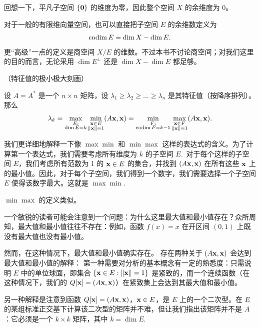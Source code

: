回想一下，平凡子空间 $\{\mathbf{0}\}$ 的维度为零，因此整个空间 $X$ 的余维度为 0。

\begin{remark*}
对于一般的有限维向量空间，也可以直接把子空间 $E$ 的余维数定义为
$$\operatorname{codim} E=\dim X-\dim E.$$
更“高级”一点的定义是商空间 $X/E$ 的维数。不过本书不讨论商空间；对我们这里的目的而言，无论采用 $\dim E^\perp$ 还是 $\dim X-\dim E$ 都足够。
\end{remark*}

\begin{theorem}\label{stmt:07-04-03}  （特征值的极小极大刻画）

设 $A = A^*$ 是一个 $n \times n$ 矩阵，设 $\lambda_1 \ge \lambda_2 \ge \dots \ge \lambda_n$ 是其特征值（按降序排列）。那么
$$\lambda_k = \max_{\substack{E:\\ \dim E = k}} \min_{\substack{\mathbf{x} \in E\\ \|\mathbf{x}\|=1}} (A\mathbf{x}, \mathbf{x}) = \min_{\substack{F:\\ \operatorname{codim} F = k-1}} \max_{\substack{\mathbf{x} \in F\\ \|\mathbf{x}\|=1}} (A\mathbf{x}, \mathbf{x}).$$\end{theorem}

我们更详细地解释一下像 $\max \min$ 和 $\min \max$ 这样的表达式的含义。为了计算第一个表达式，我们需要考虑所有维度为 $k$ 的子空间 $E$.~对于每个这样的子空间 $E$，我们考虑所有范数为 1 的 $\mathbf{x} \in E$ 的集合，并找到 $(A\mathbf{x}, \mathbf{x})$ 在所有这些 $\mathbf{x}$ 上的最小值。因此，对于每个子空间，我们得到一个数字，我们需要选择一个子空间 $E$ 使得该数字最大。这就是 $\max \min$.~

$\min \max$ 的定义类似。

\begin{remark*}
一个敏锐的读者可能会注意到一个问题：为什么这里最大值和最小值存在？众所周知，最大值和最小值往往不存在：例如，函数 $f(x) = x$ 在开区间 $(0, 1)$ 上既没有最大值也没有最小值。
\end{remark*}

然而，在这种情况下，最大值和最小值确实存在。
存在两种关于 $(A\mathbf{x}, \mathbf{x})$ 会达到最大值和最小值的解释：
第一种需要对分析的基本概念有一定的熟悉度：只需说明 $E$ 中的单位球面，即集合 $\{\mathbf{x} \in E : \|\mathbf{x}\| = 1\}$ 是紧致的，而一个连续函数（在这种情况下，我们的 $Q[\mathbf{x}] = (A\mathbf{x}, \mathbf{x})$）在紧致集上会达到其最大值和最小值。

另一种解释是注意到函数 $Q[\mathbf{x}] = (A\mathbf{x}, \mathbf{x})$，$\mathbf{x} \in E$，是 $E$ 上的一个二次型。在 $E$ 的某组标准正交基下计算该二次型的矩阵并不难，但让我们指出该矩阵并不是 $A$：它必须是一个 $k \times k$ 矩阵，其中 $k = \dim E$.~

